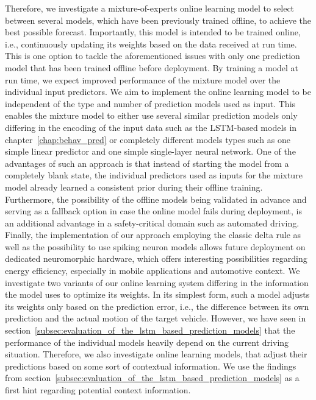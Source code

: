Therefore, we investigate a mixture-of-experts online learning model to select between several models, which have been previously trained offline, to achieve the best possible forecast.
Importantly, this model is intended to be trained online, i.e., continuously updating its weights based on the data received at run time.
This is one option to tackle the aforementioned issues with only one prediction model that has been trained offline before deployment.
By training a model at run time, we expect improved performance of the mixture model over the individual input predictors.
We aim to implement the online learning model to be independent of the type and number of prediction models used as input.
This enables the mixture model to either use several similar prediction models only differing in the encoding of the input data such as the \ac{LSTM}-based models in chapter~\ref{chap:behav_pred} or completely different models types such as one simple linear predictor and one simple single-layer neural network.
One of the advantages of such an approach is that instead of starting the model from a completely blank state, the individual predictors used as inputs for the mixture model already learned a consistent prior during their offline training.
Furthermore, the possibility of the offline models being validated in advance and serving as a fallback option in case the online model fails during deployment, is an additional advantage in a safety-critical domain such as automated driving.
Finally, the implementation of our approach employing the classic delta rule as well as the possibility to use spiking neuron models allows future deployment on dedicated neuromorphic hardware, which offers interesting possibilities regarding energy efficiency, especially in mobile applications and automotive context.
We investigate two variants of our online learning system differing in the information the model uses to optimize its weights.
In its simplest form, such a model adjusts its weights only based on the prediction error, i.e., the difference between its own prediction and the actual motion of the target vehicle.
However, we have seen in section~\ref{subsec:evaluation_of_the_lstm_based_prediction_models} that the performance of the individual models heavily depend on the current driving situation.
Therefore, we also investigate online learning models, that adjust their predictions based on some sort of contextual information.
We use the findings from section~\ref{subsec:evaluation_of_the_lstm_based_prediction_models} as a first hint regarding potential context information.

